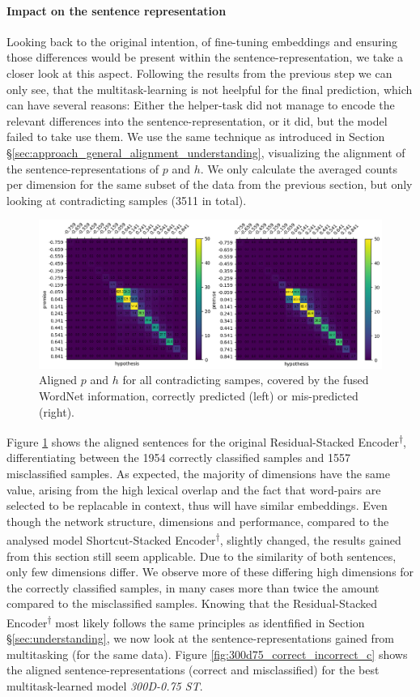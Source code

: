 \paragraph*{Impact on the sentence representation}
Looking back to the original intention, of fine-tuning embeddings and ensuring those differences would be present within the sentence-representation, we take a closer look at this aspect. Following the results from the previous step we can only see, that the multitask-learning is not heelpful for the final prediction, which can have several reasons: Either the helper-task did not manage to encode the relevant differences into the sentence-representation, or it did, but the model failed to take use them. We use the same technique as introduced in Section §\ref{sec:approach_general_alignment_understanding}, visualizing the alignment of the sentence-representations of $p$ and $h$. We only calculate the averaged counts per dimension for the same subset of the data from the previous section, but only looking at contradicting samples (3511 in total).
\begin{figure}[tph!]
\centering
	\includegraphics[totalheight=7cm]{fig/base_correct_incorrect_c.png}
	\caption{Aligned $p$ and $h$ for all contradicting sampes, covered by the fused WordNet information, correctly predicted (left) or mis-predicted (right).}
	\label{fig:base_correct_incorrect_c}
\end{figure}
Figure \ref{fig:base_correct_incorrect_c} shows the aligned sentences for the original Residual-Stacked Encoder\textsuperscript{$\dagger$}, differentiating between the 1954 correctly classified samples and 1557 misclassified samples. As expected, the majority of dimensions have the same value, arising from the high lexical overlap and the fact that word-pairs are selected to be replacable in context, thus will have similar embeddings. Even though the network structure, dimensions and performance, compared to the analysed model Shortcut-Stacked Encoder\textsuperscript{$\dagger$}, slightly changed, the results gained from this section still seem applicable. Due to the similarity of both sentences, only few dimensions differ. We observe more of these differing high dimensions for the correctly classified samples, in many cases more than twice the amount compared to the misclassified samples. Knowing that the Residual-Stacked Encoder\textsuperscript{$\dagger$} most likely follows the same principles as identfified in Section §\ref{sec:understanding}, we now look at the sentence-representations gained from multitasking (for the same data). Figure \ref{fig:300d75_correct_incorrect_c} shows the aligned sentence-representations (correct and misclassified) for the best multitask-learned model \textit{300D-0.75 ST}.
